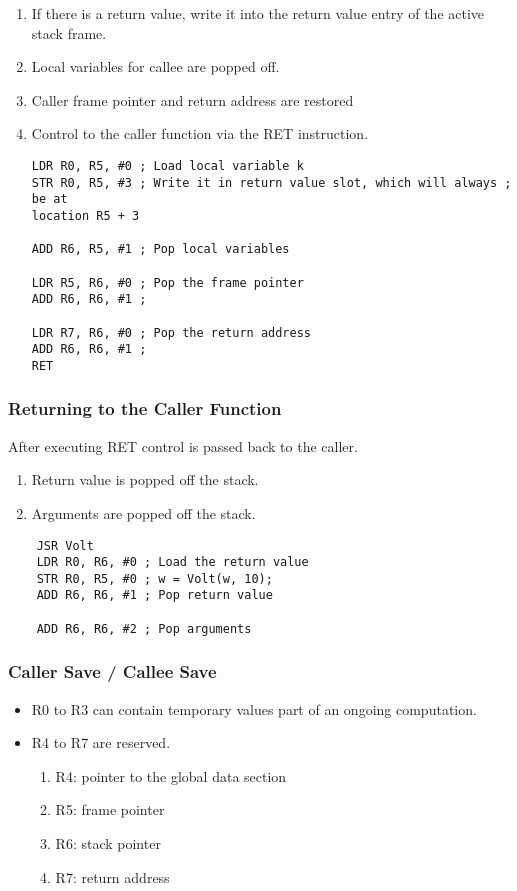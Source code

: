 \begin{enumerate}
    \item If there is a return value, write it into the return value entry of the active stack frame.
    \item Local variables for callee are popped off.
    \item Caller frame pointer and return address are restored
    \item Control to the caller function via the RET instruction.
        \begin{verbatim}
LDR R0, R5, #0 ; Load local variable k
STR R0, R5, #3 ; Write it in return value slot, which will always ; be at 
location R5 + 3

ADD R6, R5, #1 ; Pop local variables

LDR R5, R6, #0 ; Pop the frame pointer
ADD R6, R6, #1 ;

LDR R7, R6, #0 ; Pop the return address
ADD R6, R6, #1 ;
RET
        \end{verbatim}
\end{enumerate}


\subsubsection{Returning to the Caller Function}
After executing RET control is passed back to the caller. 
\begin{enumerate}
    \item Return value is popped off the stack.
    \item Arguments are popped off the stack.
\end{enumerate}
\begin{verbatim}
    JSR Volt
    LDR R0, R6, #0 ; Load the return value
    STR R0, R5, #0 ; w = Volt(w, 10);
    ADD R6, R6, #1 ; Pop return value
    
    ADD R6, R6, #2 ; Pop arguments
\end{verbatim}


\subsubsection{Caller Save / Callee Save}
\begin{itemize}
    \item R0 to R3 can contain temporary values part of an ongoing computation. 
    \item R4 to R7 are reserved. 
        \begin{enumerate}
            \item R4: pointer to the global data section
            \item R5: frame pointer
            \item R6: stack pointer
            \item R7: return address
        \end{enumerate}
\end{itemize}



